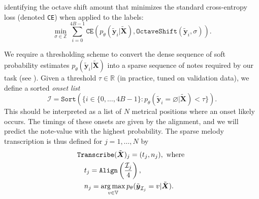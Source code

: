 identifying the octave shift amount that minimizes the standard cross-entropy loss (denoted \texttt{CE}) when applied to the labels:
\begin{equation*}
\operatorname*{min}_{\sigma \in \mathbb{Z}} \sum_{i=0}^{4B-1} \texttt{CE}(p_\theta(\tilde{\bm{y}}_i|\bm{\tilde{X}}), \texttt{OctaveShift}(\tilde{\bm{y}}_i, \sigma)).
\end{equation*}

We require a thresholding scheme to convert the dense sequence of soft probability estimates $p_\theta(\tilde{\bm{y}}_i|\tilde{\bm{X}})$ into a sparse sequence of notes required by our task (see ). Given a threshold $\tau\in\mathbb{R}$ (in practice, tuned on validation data), we define a sorted \emph{onset list}
\[
\mathcal{I} = \texttt{Sort}(\{i \in \{0,\dots,4B-1\} : p_\theta(\tilde{\bm{y}}_i = \varnothing|\tilde{\bm{X}}) < \tau\}).
\]
This should be interpreted as a list of $N$ metrical positions where an onset likely occurs. The timings of these onsets are given by the alignment, and we will predict the note-value with the highest probability. The sparse melody transcription is thus defined for $j=1,\dots,N$ by
\begin{align*}
&\texttt{Transcribe}(\tilde{\mbox{\boldmath{$X$}}})_j = (t_j,n_j),\text{ where }\\
&\quad t_j = \texttt{Align}\left(\frac{\mathcal{I}_j}{4}\right),\\
&\quad n_j = \operatorname*{arg\,max}_{v\in\mathbb{V}} p_\theta(\tilde{\mbox{\boldmath{$y$}}}_{\mathcal{I}_j} = v|\tilde{\mbox{\boldmath{$X$}}}).
\end{align*}